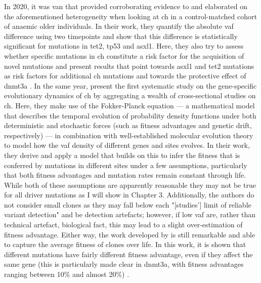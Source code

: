 In 2020, it was van  that provided corroborating evidence to and elaborated on the aforementioned heterogeneity when looking at \ac{ch} in a control-matched cohort of anaemic older individuals. In their work, they quantify the absolute \ac{vaf} difference using two timepoints and show that this difference is statistically significant for mutations in \ac{tet2}, \ac{tp53} and \ac{asxl1}. Here, they also try to assess whether specific mutations in \ac{ch} constitute a risk factor for the acquisition of novel mutations and present results that point towards \ac{asxl1} and \ac{tet2} mutations as risk factors for additional \ac{ch} mutations and towards the protective effect of \ac{dnmt3a} \cite{Van_Zeventer2020-pw}. In the same year,  present the first systematic study on the gene-specific evolutionary dynamics of \ac{ch} by aggregating a wealth of cross-sectional studies on \ac{ch}. Here, they make use of the Fokker-Planck equation --- a mathematical model that describes the temporal evolution of probability density functions under both deterministic and stochastic forces (such as fitness advantages and genetic drift, respectively) --- in combination with well-established molecular evolution theory to model how the \ac{vaf} density of different genes and sites evolves. In their work, they derive and apply a model that builds on this to infer the fitness that is conferred by mutations in different sites under a few assumptions, particularly that both fitness advantages and mutation rates remain constant through life. While both of these assumptions are apparently reasonable they may not be true for all driver mutations as I will show in Chapter 3. Additionally, the authors do not consider small clones as they may fall below each "[studies'] limit of reliable variant detection" and be detection artefacts; however, if low \ac{vaf} are, rather than technical artefact, biological fact, this may lead to a slight over-estimation of fitness advantage. Either way, the work developed by  is still remarkable and able to capture the average fitness of clones over life. In this work, it is shown that different mutations have fairly different fitness advantage, even if they affect the same gene (this is particularly made clear in \ac{dnmt3a}, with fitness advantages ranging between 10\% and almost 20\%) \cite{Watson2020-pz}.

